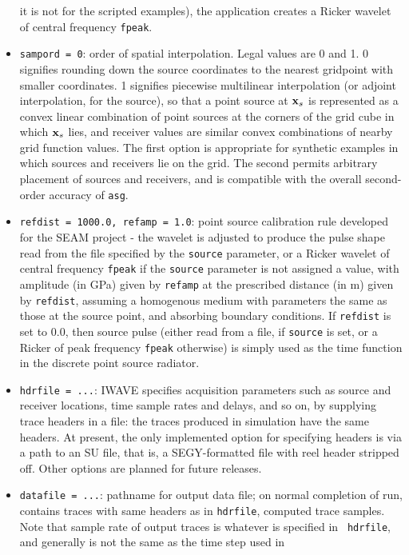 \begin{itemize}
  it is not for the scripted examples), the application creates a Ricker wavelet of central
  frequency {\tt fpeak}.
\item{\tt sampord = 0}: order of spatial interpolation. Legal values
  are 0 and 1. 0 signifies rounding down the source coordinates to the
  nearest gridpoint with smaller coordinates. 1 signifies piecewise
  multilinear interpolation (or adjoint interpolation, for the
  source), so that a point source at ${\bf x}_s$ is
  represented as a convex linear combination of point sources at
  the corners of the grid cube in which ${\bf x}_s$ lies, and receiver values
  are similar convex combinations of nearby grid function values. The first option is
  appropriate for synthetic examples in which sources and receivers
  lie on the grid. The second permits arbitrary placement of sources
  and receivers, and is compatible with the overall second-order
  accuracy of {\tt asg}.
\item {\tt refdist = 1000.0, refamp = 1.0}: point source calibration
  rule developed for the SEAM project - the wavelet is
  adjusted to produce the pulse shape read from the file specified by
  the {\tt source} parameter, or a Ricker wavelet of central frequency
  {\tt fpeak} if the {\tt source} parameter is not assigned a value,
  with amplitude (in GPa) given by {\tt refamp} at the
  prescribed distance (in m) given by {\tt refdist}, assuming a homogenous medium with
  parameters the same as those at the source point, and absorbing
  boundary conditions. If {\tt refdist} is set to $0.0$, then source
  pulse (either read from a file, if {\tt source} is set, or a Ricker
  of peak frequency {\tt fpeak} otherwise) is simply used as the time
  function in the discrete point source radiator. 
\item {\tt hdrfile = ...}: IWAVE specifies acquisition parameters
  such as source and receiver locations, time sample rates and delays,
  and so on, by supplying trace headers in a file: the traces produced
  in simulation have the same headers. At present, the only
  implemented option for specifying headers is via a path to an SU
  file, that is, a SEGY-formatted file with reel header stripped
  off. Other options are planned for future releases.
\item {\tt datafile = ...}: pathname for output data file; on normal
  completion of run, contains traces with
  same headers as in {\tt hdrfile}, computed trace samples. Note that
  sample rate of output traces is whatever is specified in {\tt
    hdrfile}, and generally is not the same as the time step used in

\end{itemize}
